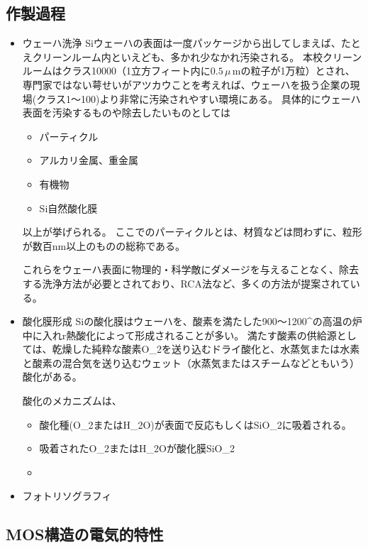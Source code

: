 \documentclass[11pt]{jarticle}
\begin{document}
	\subsection{作製過程}
		\begin{itemize}
			\item ウェーハ洗浄
				Siウェーハの表面は一度パッケージから出してしまえば、たとえクリーンルーム内といえども、多かれ少なかれ汚染される。
				本校クリーンルームはクラス10000（1立方フィート内に$0.5\,\mu$\,mの粒子が1万粒）とされ、専門家ではない萼せいがアツカウことを考えれば、ウェーハを扱う企業の現場(クラス1〜100)より非常に汚染されやすい環境にある。
				具体的にウェーハ表面を汚染するものや除去したいものとしては

				\begin{itemize}
					\item パーティクル
					\item アルカリ金属、重金属
					\item 有機物
					\item Si自然酸化膜
				\end{itemize}

				以上が挙げられる。
				ここでのパーティクルとは、材質などは問わずに、粒形が数百nm以上のものの総称である。

				これらをウェーハ表面に物理的・科学敵にダメージを与えることなく、除去する洗浄方法が必要とされており、RCA法など、多くの方法が提案されている。

			\item 酸化膜形成
				Siの酸化膜はウェーハを、酸素を満たした900〜1200^\circ の高温の炉中に入れr熱酸化によって形成されることが多い。
				満たす酸素の供給源としては、乾燥した純粋な酸素O_{2}を送り込むドライ酸化と、水蒸気または水素と酸素の混合気を送り込むウェット（水蒸気またはスチームなどともいう）酸化がある。

				酸化のメカニズムは、
					\begin{itemize}
						\item 酸化種(O_{2}またはH_{2}O)が表面で反応もしくはSiO_{2}に吸着される。
						\item 吸着されたO_{2}またはH_{2}Oが酸化膜SiO_{2}
						\item
					\end{itemize}

			\item フォトリソグラフィ
		\end{itemize}

	\subsection{MOS構造の電気的特性}
		
\end{document}

